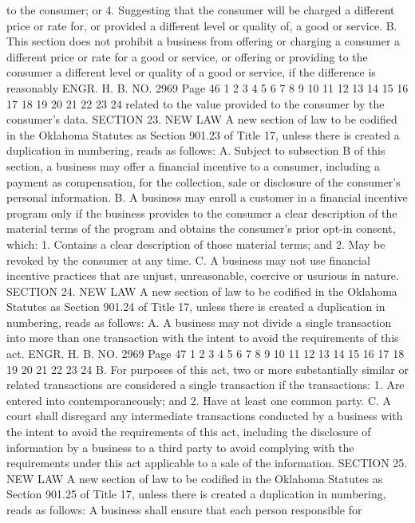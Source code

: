 to the consumer; or
4. Suggesting that the consumer will be charged a different
price or rate for, or provided a different level or quality of, a
good or service.
B. This section does not prohibit a business from offering or
charging a consumer a different price or rate for a good or service,
or offering or providing to the consumer a different level or
quality of a good or service, if the difference is reasonably 
ENGR. H. B. NO. 2969 Page 46
1
2
3
4
5
6
7
8
9
10
11
12
13
14
15
16
17
18
19
20
21
22
23
24
related to the value provided to the consumer by the consumer's
data.
SECTION 23. NEW LAW A new section of law to be codified
in the Oklahoma Statutes as Section 901.23 of Title 17, unless there
is created a duplication in numbering, reads as follows:
A. Subject to subsection B of this section, a business may
offer a financial incentive to a consumer, including a payment as
compensation, for the collection, sale or disclosure of the
consumer's personal information.
B. A business may enroll a customer in a financial incentive
program only if the business provides to the consumer a clear
description of the material terms of the program and obtains the
consumer's prior opt-in consent, which:
1. Contains a clear description of those material terms; and
2. May be revoked by the consumer at any time.
C. A business may not use financial incentive practices that
are unjust, unreasonable, coercive or usurious in nature.
SECTION 24. NEW LAW A new section of law to be codified
in the Oklahoma Statutes as Section 901.24 of Title 17, unless there
is created a duplication in numbering, reads as follows:
A. A business may not divide a single transaction into more
than one transaction with the intent to avoid the requirements of
this act.
ENGR. H. B. NO. 2969 Page 47
1
2
3
4
5
6
7
8
9
10
11
12
13
14
15
16
17
18
19
20
21
22
23
24
B. For purposes of this act, two or more substantially similar
or related transactions are considered a single transaction if the
transactions:
1. Are entered into contemporaneously; and
2. Have at least one common party.
C. A court shall disregard any intermediate transactions
conducted by a business with the intent to avoid the requirements of
this act, including the disclosure of information by a business to a
third party to avoid complying with the requirements under this act
applicable to a sale of the information.
SECTION 25. NEW LAW A new section of law to be codified
in the Oklahoma Statutes as Section 901.25 of Title 17, unless there
is created a duplication in numbering, reads as follows:
A business shall ensure that each person responsible for
